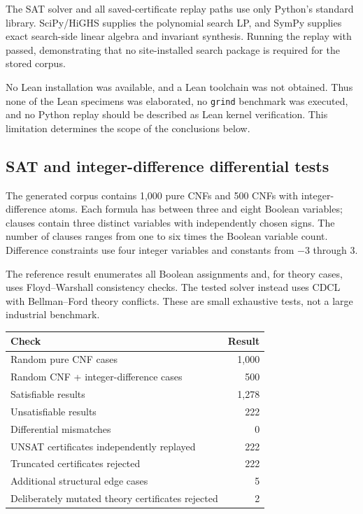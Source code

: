 \documentclass[11pt,letterpaper]{article}
\newcommand{\code}[1]{\texttt{\detokenize{#1}}}
\newcommand{\grind}{\texttt{grind}}
\theoremstyle{definition}\newtheorem{definition}[proposition]{Definition}
\begin{document}
The SAT solver and all saved-certificate replay paths use only Python's standard library. SciPy/HiGHS supplies the polynomial search LP, and SymPy supplies exact search-side linear algebra and invariant synthesis. Running the replay with \code{python -S} passed, demonstrating that no site-installed search package is required for the stored corpus.

No Lean installation was available, and a Lean toolchain was not obtained. Thus none of the Lean specimens was elaborated, no \grind{} benchmark was executed, and no Python replay should be described as Lean kernel verification. This limitation determines the scope of the conclusions below.

\subsection{SAT and integer-difference differential tests}
The generated corpus contains 1,000 pure CNFs and 500 CNFs with integer-difference atoms. Each formula has between three and eight Boolean variables; clauses contain three distinct variables with independently chosen signs. The number of clauses ranges from one to six times the Boolean variable count. Difference constraints use four integer variables and constants from $-3$ through $3$.

The reference result enumerates all Boolean assignments and, for theory cases, uses Floyd--Warshall consistency checks. The tested solver instead uses CDCL with Bellman--Ford theory conflicts. These are small exhaustive tests, not a large industrial benchmark.

\begin{center}
\begin{tabular}{@{}lr@{}}
\toprule
Check & Result \\
\midrule
Random pure CNF cases & 1,000 \\
Random CNF + integer-difference cases & 500 \\
Satisfiable results & 1,278 \\
Unsatisfiable results & 222 \\
Differential mismatches & 0 \\
UNSAT certificates independently replayed & 222 \\
Truncated certificates rejected & 222 \\
Additional structural edge cases & 5 \\
Deliberately mutated theory certificates rejected & 2 \\
\bottomrule
\end{tabular}
\end{center}
\end{document}
